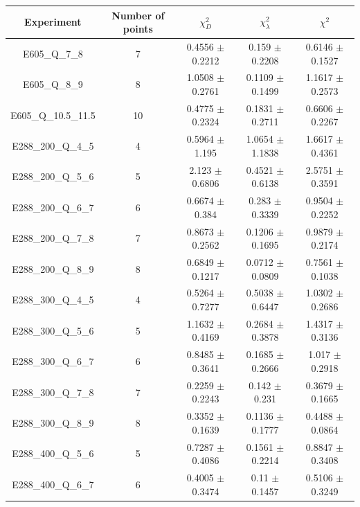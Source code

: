 \documentclass[
]{article}
\begin{document}
\begin{table}[h]

\centering

\begin{tabular}{|c|c|c|c|c|} \hline

\textbf{Experiment} & \textbf{Number of
points} & \textbf{\(\chi_{D}^2\)} & \textbf{\(\chi_{\lambda}^2\)} & \textbf{\(\chi^2\)} \\ \hline

E605\_Q\_7\_8 & 7 & 0.4556 \(\pm\) 0.2212 & 0.159 \(\pm\)
0.2208 & 0.6146 \(\pm\) 0.1527 \\ \hline
E605\_Q\_8\_9 & 8 & 1.0508 \(\pm\) 0.2761 & 0.1109 \(\pm\)
0.1499 & 1.1617 \(\pm\) 0.2573 \\ \hline
E605\_Q\_10.5\_11.5 & 10 & 0.4775 \(\pm\) 0.2324 & 0.1831 \(\pm\)
0.2711 & 0.6606 \(\pm\) 0.2267 \\ \hline
E288\_200\_Q\_4\_5 & 4 & 0.5964 \(\pm\) 1.195 & 1.0654 \(\pm\)
1.1838 & 1.6617 \(\pm\) 0.4361 \\ \hline
E288\_200\_Q\_5\_6 & 5 & 2.123 \(\pm\) 0.6806 & 0.4521 \(\pm\)
0.6138 & 2.5751 \(\pm\) 0.3591 \\ \hline
E288\_200\_Q\_6\_7 & 6 & 0.6674 \(\pm\) 0.384 & 0.283 \(\pm\)
0.3339 & 0.9504 \(\pm\) 0.2252 \\ \hline
E288\_200\_Q\_7\_8 & 7 & 0.8673 \(\pm\) 0.2562 & 0.1206 \(\pm\)
0.1695 & 0.9879 \(\pm\) 0.2174 \\ \hline
E288\_200\_Q\_8\_9 & 8 & 0.6849 \(\pm\) 0.1217 & 0.0712 \(\pm\)
0.0809 & 0.7561 \(\pm\) 0.1038 \\ \hline
E288\_300\_Q\_4\_5 & 4 & 0.5264 \(\pm\) 0.7277 & 0.5038 \(\pm\)
0.6447 & 1.0302 \(\pm\) 0.2686 \\ \hline
E288\_300\_Q\_5\_6 & 5 & 1.1632 \(\pm\) 0.4169 & 0.2684 \(\pm\)
0.3878 & 1.4317 \(\pm\) 0.3136 \\ \hline
E288\_300\_Q\_6\_7 & 6 & 0.8485 \(\pm\) 0.3641 & 0.1685 \(\pm\)
0.2666 & 1.017 \(\pm\) 0.2918 \\ \hline
E288\_300\_Q\_7\_8 & 7 & 0.2259 \(\pm\) 0.2243 & 0.142 \(\pm\)
0.231 & 0.3679 \(\pm\) 0.1665 \\ \hline
E288\_300\_Q\_8\_9 & 8 & 0.3352 \(\pm\) 0.1639 & 0.1136 \(\pm\)
0.1777 & 0.4488 \(\pm\) 0.0864 \\ \hline
E288\_400\_Q\_5\_6 & 5 & 0.7287 \(\pm\) 0.4086 & 0.1561 \(\pm\)
0.2214 & 0.8847 \(\pm\) 0.3408 \\ \hline
E288\_400\_Q\_6\_7 & 6 & 0.4005 \(\pm\) 0.3474 & 0.11 \(\pm\)
0.1457 & 0.5106 \(\pm\) 0.3249 \\ \hline

\end{tabular}
\end{table}
\end{document}
